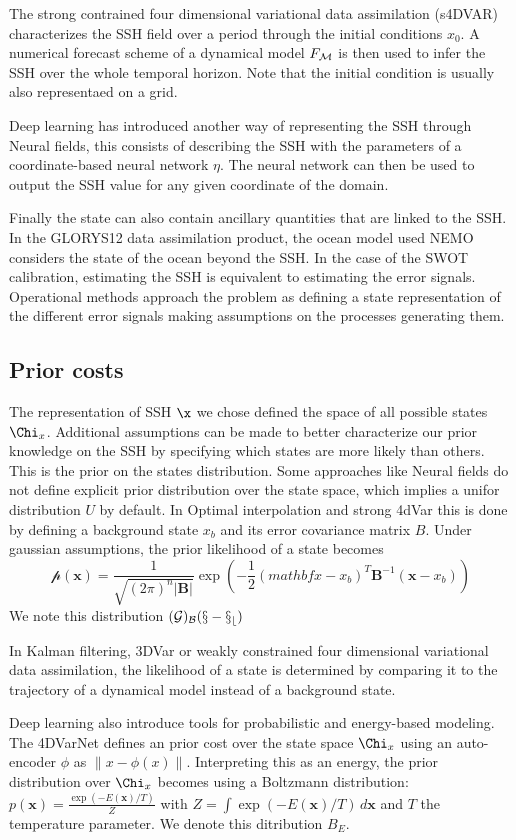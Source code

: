 \begin{bibunit}
  The strong contrained four dimensional variational data assimilation (s4DVAR)\cite{} characterizes the SSH field over a period through the initial conditions $x_0$. A numerical forecast scheme of a dynamical model $F_{\cal{M}}$ is then used to infer the SSH over the whole temporal horizon. Note that the initial condition is usually also representaed on a grid. 

Deep learning has introduced another way of representing the SSH through Neural fields\cite{}, this consists of describing the SSH with the parameters of a coordinate-based neural network $\eta$. The neural network can then be used to output the SSH value for any given coordinate of the domain.


Finally the state can also contain ancillary quantities that are linked to the SSH. In the GLORYS12\cite{} data assimilation product, the ocean model used NEMO\cite{} considers the state of the ocean beyond the SSH.
In the case of the SWOT calibration, estimating the SSH is equivalent to estimating the error signals. Operational methods approach the problem as defining a state representation of the different error signals making assumptions on the processes generating them.

\subsection{Prior costs}
The representation of SSH $\x$ we chose defined the space of all possible states $\Chi_x$. Additional assumptions can be made to better characterize our prior knowledge on the SSH by specifying which states are more likely than others. This is the prior on the states distribution.
Some approaches like Neural fields do not define explicit prior distribution over the state space, which implies a unifor distribution $U$ by default.
In Optimal interpolation and strong 4dVar this is done by defining a background state $x_b$ and its error covariance matrix $B$. Under gaussian assumptions, the prior likelihood of a state becomes 
 $$\mathcal{p}(\mathbf{x}) = \frac{1}{\sqrt{(2\pi)^n |\mathbf{B}|}} \exp\left(-\frac{1}{2} (mathbf{x} - x_b)^T \mathbf{B}^{-1} (\mathbf{x} - x_b)\right)$$
  We note this distribution $\cal(G)_B(x - x_b)$

In Kalman filtering, 3DVar or weakly constrained four dimensional variational data assimilation, the likelihood of a state is determined by comparing it to the trajectory of a dynamical model instead of a background state.

  Deep learning also introduce tools for probabilistic and energy-based modeling. The 4DVarNet defines an prior cost over the state space $\Chi_x$ using an auto-encoder $\phi$  as $\| x - \phi(x)\|$. Interpreting this as an energy, the prior distribution over $\Chi_x$ becomes using a Boltzmann distribution:  $p(\mathbf{x}) = \frac{\exp(-E(\mathbf{x}) / T)}{Z}$ with $Z = \int \exp(-E(\mathbf{x}) / T) \, d\mathbf{x}$ and $T$ the temperature parameter. We denote this ditribution $B_{E}$.




\end{bibunit}
